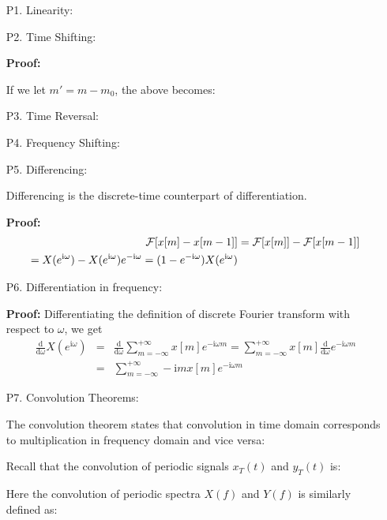 	\begin{enumerate}
	\item[P1.] Linearity:
	
	
	\item[P2.] Time Shifting:
	
	{\bf Proof:} 
	
	If we let $m'=m-m_0$, the above becomes:
	
	
	\item[P3.] Time Reversal:
	
	
	
	\item[P4.] Frequency Shifting:
	
	
	\item[P5.] Differencing:
	
	Differencing is the discrete-time counterpart of differentiation.
	
	{\bf Proof:} 
	\begin{eqnarray}
	 {\cal F}[x[m]-x[m-1]]&={\cal F}[x[m]]-{\cal F}[x[m-1]]
		\nonumber \\
	= X(e^{\mathrm{i}\omega})-X(e^{\mathrm{i}\omega})e^{-\mathrm{i}\omega}=(1-e^{-\mathrm{i}\omega})X(e^{\mathrm{i}\omega})
		\nonumber 
	\end{eqnarray}
	
	\item[P6.] Differentiation in frequency:
	
	{\bf Proof:} 
	Differentiating the definition of discrete Fourier transform with respect to 
	$\omega$, we get
	\begin{eqnarray}
	\frac{\mathrm{d}}{\mathrm{d}\omega}X(e^{\mathrm{i}\omega})&=&\frac{\mathrm{d}}{\mathrm{d}\omega}\sum_{m=-\infty}^{+\infty} 
		x[m]e^{-\mathrm{i}\omega m}
		=\sum_{m=-\infty}^{+\infty} x[m]\frac{\mathrm{d}}{\mathrm{d}\omega}e^{-\mathrm{i}\omega m}
		\nonumber \\
	&=&\sum_{m=-\infty}^{+\infty} -\mathrm{i}mx[m]e^{-\mathrm{i}\omega m}
		\nonumber 
	\end{eqnarray}
	
	\item[P7.] Convolution Theorems:
	
	The convolution theorem states that convolution in time domain corresponds to multiplication in frequency domain and vice versa:
	
	
	Recall that the convolution of periodic signals $x_T(t)$ and $y_T(t)$ is:
	
	Here the convolution of periodic spectra $X(f)$ and $Y(f)$ is similarly defined as:
	

\end{enumerate}
